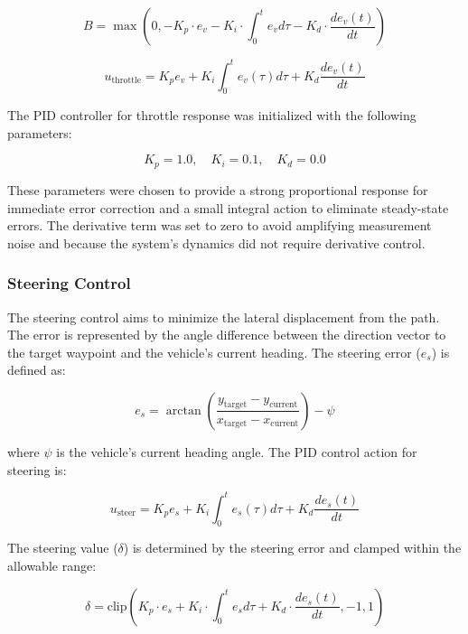 \documentclass[conference]{IEEEtran}
\begin{document}
\begin{equation}
B = \max(0, -K_p \cdot e_v - K_i \cdot \int_{0}^{t} e_v d\tau - K_d \cdot \frac{de_v(t)}{dt})
\end{equation}

\begin{equation}
u_{\text{throttle}} = K_p e_v + K_i \int_{0}^{t} e_v(\tau) d\tau + K_d \frac{de_v(t)}{dt}
\end{equation}

The PID controller for throttle response was initialized with the following parameters:

\begin{equation}
K_p = 1.0,\quad K_i = 0.1,\quad K_d = 0.0
\end{equation}

These parameters were chosen to provide a strong proportional response for immediate error correction and a small integral action to eliminate steady-state errors. The derivative term was set to zero to avoid amplifying measurement noise and because the system's dynamics did not require derivative control.

\subsubsection{Steering Control}

The steering control aims to minimize the lateral displacement from the path. The error is represented by the angle difference between the direction vector to the target waypoint and the vehicle's current heading. The steering error ($e_s$) is defined as:

\begin{equation}
e_s = \arctan \left( \frac{y_{\text{target}} - y_{\text{current}}}{x_{\text{target}} - x_{\text{current}}} \right) - \psi
\end{equation}

where $\psi$ is the vehicle's current heading angle. The PID control action for steering is:

\begin{equation}
u_{\text{steer}} = K_p e_s + K_i \int_{0}^{t} e_s(\tau) d\tau + K_d \frac{de_s(t)}{dt}
\end{equation}

The steering value ($\delta$) is determined by the steering error and clamped within the allowable range:

\begin{equation}
\delta = \text{clip}\left( K_p \cdot e_s + K_i \cdot \int_{0}^{t} e_s d\tau + K_d \cdot \frac{de_s(t)}{dt}, -1, 1 \right)
\end{equation}
\end{document}
